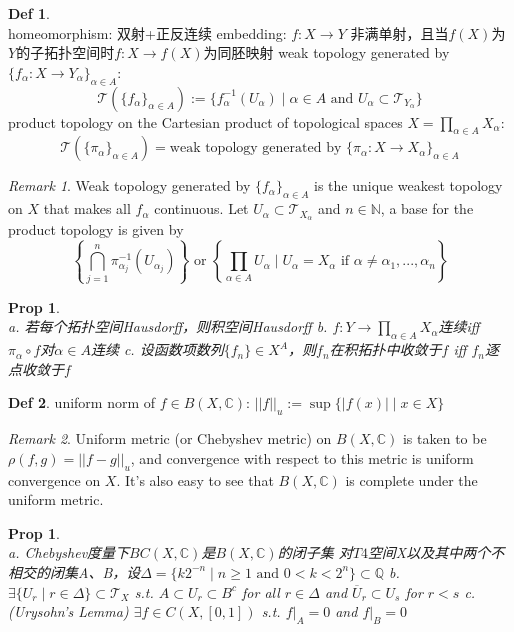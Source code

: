 \documentclass[hidelinks]{article}
\theoremstyle{definition}
\newtheorem*{defin}{Def}
\theoremstyle{plain}
\newtheorem{proposition}[theorem]{Prop}
\theoremstyle{remark}
\newtheorem*{remark}{Remark}
\begin{document}
\begin{defin}~\\
homeomorphism: 双射+正反连续 \newline
embedding: $f:X\to Y$ 非满单射，且当$f(X)$为$Y$的子拓扑空间时$f:X\to f(X)$为同胚映射 \newline
weak topology generated by $\{f_\alpha:X\to Y_\alpha\}_{\alpha \in A}$:
\[
\mathscr{T}(\{f_\alpha\}_{\alpha \in A}):=\{f^{-1}_\alpha(U_\alpha)\mid \alpha \in A \textrm{ and } U_\alpha \subset \mathscr{T}_{Y_\alpha}\}
\]
product topology on the Cartesian product of topological spaces $X=\prod_{\alpha \in A}X_\alpha$:
\[ \mathscr{T}(\{\pi_\alpha\}_{\alpha \in A})=\textrm{weak topology generated by }\{\pi_\alpha:X \to X_\alpha\}_{\alpha \in A}
\]
\end{defin}

\begin{remark}
Weak topology generated by $\{f_\alpha\}_{\alpha \in A}$ is the unique weakest topology on $X$ that makes all $f_\alpha$ continuous. Let $U_\alpha \subset \mathscr{T}_{X_\alpha}$ and $n\in \mathbb{N}$, a base for the product topology is given by
\[
\left\{\bigcap_{j=1}^{n}\pi^{-1}_{\alpha_j}(U_{\alpha_j})\right\} \textrm{ or } \left\{\prod_{\alpha \in A}U_\alpha \mid U_\alpha=X_\alpha \textrm{ if } \alpha \neq \alpha_1,...,\alpha_n\right\} 
\]
\end{remark}

\begin{proposition}~\\
a. 若每个拓扑空间Hausdorff，则积空间Hausdorff\newline
b. $f:Y\to \prod_{\alpha \in A}X_\alpha$连续iff $\pi_\alpha \circ f$对$\alpha \in A$连续 \newline
c. 设函数项数列$\{f_n\}\in X^A$，则$f_n$在积拓扑中收敛于$f$ iff $f_n$逐点收敛于$f$
\end{proposition}

\begin{defin}
uniform norm of $f\in B(X,\mathbb{C})$: $||f||_u:=\sup{\{|f(x)|\mid x\in X\}}$
\end{defin}

\begin{remark}
Uniform metric (or Chebyshev metric) on $B(X,\mathbb{C})$ is taken to be $\rho(f,g)=||f-g||_u$, and convergence with respect to this metric is uniform convergence on $X$. It's also easy to see that $B(X,\mathbb{C})$ is complete under the uniform metric.
\end{remark}

\begin{proposition}\label{Prop 4.7}~\\
a. Chebyshev度量下$BC(X,\mathbb{C})$是$B(X,\mathbb{C})$的闭子集 \newline
对$T4$空间X以及其中两个不相交的闭集A、B，设$\Delta=\{k2^{-n}\mid n\geq 1 \textrm{ and } 0<k<2^n\}\subset \mathbb{Q}$ \newline
b. $\exists \{U_r\mid r\in \Delta\}\subset \mathscr{T}_X $ s.t. $A\subset U_r\subset B^c$ for all $r\in \Delta$ and $\overline{U}_r\subset U_s$ for $r<s$ \newline
c. (Urysohn's Lemma) $\exists f\in C(X,[0,1])$ s.t. $\left.f\right|_A=0$ and $\left.f\right|_B=0$
\end{proposition}
\end{document}
